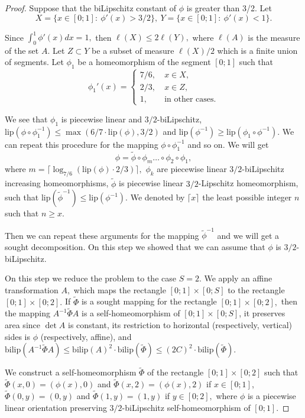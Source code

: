 \documentclass[12pt]{article}
\theoremstyle{definition}
\begin{document}
\begin{proof}
Suppose that the biLipschitz constant of $\phi$ is greater than 3/2.
Let
$$X = \{x\in[0;1]:\ \phi'(x) > 3/2\},\ Y = \{x\in[0;1]:\ \phi'(x) < 1\}.$$ 

Since $\int_0^1 \phi'(x)dx = 1,$ then $\ell(X)\le 2\ell(Y),$ where $\ell(A)$ is the measure of the set $A.$ Let $Z\subset Y$ be a subset of measure $\ell(X)/2$ which is a finite union of segments. Let $\phi_1$ be a homeomorphism of the segment $[0;1]$ such that
$$\phi_1'(x) =
\left\{
\begin{aligned}
7/6,&\ x\in X,\\
2/3,&\ x\in Z,\\
1,&\ \text{in other cases}.
\end{aligned}
\right.
$$

We see that $\phi_1$ is piecewise linear and $3/2$-biLipschitz, $\mathrm{lip}\left(\phi\circ\phi_1^{-1}\right) \le \max(6/7\cdot\mathrm{lip}(\phi), 3/2)$ and $\mathrm{lip}(\phi^{-1})\ge\mathrm{lip}\left(\phi_1\circ\phi^{-1}\right).$ We can repeat this procedure for the mapping $\phi\circ\phi_1^{-1}$ and so on. We will get
$$
\phi = \widetilde\phi\circ\phi_m\dots\circ\phi_2\circ\phi_1,
$$
where $m = \lceil\log_{7/6}\left(\mathrm{lip}(\phi)\cdot 2/3\right)\rceil,$ $\phi_k$ are piecewise linear $3/2$-biLipschitz increasing homeomorphisms, $\widetilde \phi$ is piecewise linear $3/2$-Lipschitz homeomorphism, such that $\mathrm{lip}\left(\widetilde\phi^{-1}\right)\le\mathrm{lip}(\phi^{-1}).$ We denoted by $\lceil x\rceil$ the least possible integer $n$ such that $n\ge x.$

Then we can repeat these arguments for the mapping $\widetilde \phi^{-1}$ and we will get a sought decomposition. On this step we showed that we can assume that $\phi$ is $3/2$-biLipschitz.

\smallskip
{} On this step we reduce the problem to the case $S=2.$ We apply an affine transformation $A,$ which maps the rectangle $[0;1]\times[0;S]$ to the rectangle $[0;1]\times[0;2].$ If $\widetilde\Phi$ is a sought mapping for the rectangle $[0;1]\times[0;2],$ then the mapping $A^{-1}\widetilde\Phi A$ is a self-homeomorphism of $[0;1]\times[0;S]$, it preserves area since $\det A$ is constant, its restriction to horizontal (respectively, vertical) sides is $\phi$ (respectively, affine), and $\mathrm{bilip}\left(A^{-1}\widetilde\Phi A\right)\le \mathrm{bilip}(A)^2\cdot\mathrm{bilip}\left(\widetilde\Phi\right)\le (2C)^2\cdot\mathrm{bilip}\left(\widetilde\Phi\right).$


\smallskip
{}
We construct a self-homeomorphism $\widetilde\Phi$ of the rectangle $[0;1]\times[0;2]$ such that $\widetilde\Phi(x,0) = (\phi(x),0)$ and $\widetilde\Phi(x,2) = (\phi(x),2)$ if $x\in[0;1]$, $\widetilde\Phi(0,y) = (0,y)$ and $\widetilde\Phi(1,y) = (1, y)$ if $y\in[0;2],$ where $\phi$ is a piecewise linear orientation preserving $3/2$-biLipschitz self-homeomorphism of $[0;1].$


\end{proof}
\end{document}
